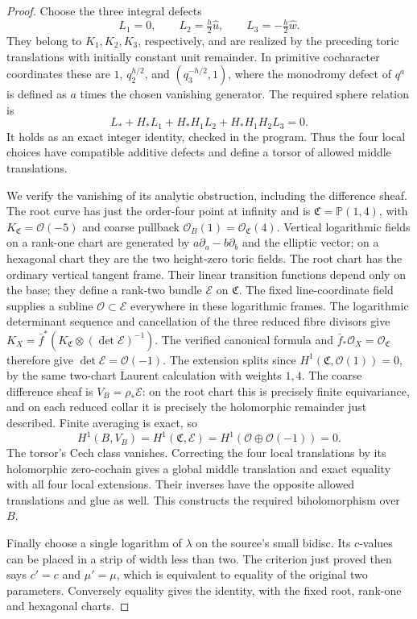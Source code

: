 \begin{proof}
Choose the three integral defects
\[
 L_1=0,\qquad L_2=\tfrac h2\widehat u,\qquad
 L_3=-\tfrac h2\widehat w.
\]
They belong to $K_1,K_2,K_3$, respectively, and are realized
by the preceding toric translations with initially constant
unit remainder.  In primitive cocharacter coordinates these
are $1$, $q_2^{h/2}$, and $(q_3^{-h/2},1)$, where the
monodromy defect of $q^a$ is defined as $a$ times the chosen
vanishing generator.  The required sphere relation is
\[
 L_*+H_*L_1+H_*H_1L_2+H_*H_1H_2L_3=0.
\]
It holds as an exact integer identity, checked in the program.
Thus the four local choices have compatible additive defects
and define a torsor of allowed middle translations.

We verify the vanishing of its analytic obstruction, including
the difference sheaf.  The root curve has just the order-four
point at infinity and is $\mathfrak C=\mathbb P(1,4)$,
with $K_{\mathfrak C}=\mathcal O(-5)$ and coarse pullback
$\mathcal O_B(1)=\mathcal O_{\mathfrak C}(4)$.
Vertical logarithmic fields on a rank-one chart are generated
by $a\partial_a-b\partial_b$ and the elliptic vector;
on a hexagonal chart they are the two height-zero toric fields.
The root chart has the ordinary vertical tangent frame.
Their linear transition functions depend only on the base;
they define a rank-two bundle $\mathcal E$ on $\mathfrak C$.
The fixed line-coordinate field supplies a subline
$\mathcal O\subset\mathcal E$ everywhere in these logarithmic
frames.  The logarithmic determinant sequence and cancellation
of the three reduced fibre divisors give
$K_X=\bar f^*(K_{\mathfrak C}\otimes(\det\mathcal E)^{-1})$.
The verified canonical formula and
$\bar f_*\mathcal O_X=\mathcal O_{\mathfrak C}$ therefore
give $\det\mathcal E=\mathcal O(-1)$.
The extension splits since
$H^1(\mathfrak C,\mathcal O(1))=0$, by the same two-chart
Laurent calculation with weights $1,4$.
The coarse difference sheaf is $V_B=\rho_*\mathcal E$:
on the root chart this is precisely finite equivariance,
and on each reduced collar it is precisely the holomorphic
remainder just described.  Finite averaging is exact, so
\[
 H^1(B,V_B)=H^1(\mathfrak C,\mathcal E)
 =H^1(\mathcal O\oplus\mathcal O(-1))=0.
\]
The torsor's Cech class vanishes.  Correcting the four local
translations by its holomorphic zero-cochain gives a global
middle translation and exact equality with all four local
extensions.  Their inverses have the opposite allowed
translations and glue as well.  This constructs the required
biholomorphism over $B$.

Finally choose a single logarithm of $\lambda$ on the source's
small bidisc.  Its $c$-values can be placed in a strip of
width less than two.  The criterion just proved then says
$c'=c$ and $\mu'=\mu$, which is equivalent to equality of
the original two parameters.  Conversely equality gives the
identity, with the fixed root, rank-one and hexagonal charts.
\end{proof}

